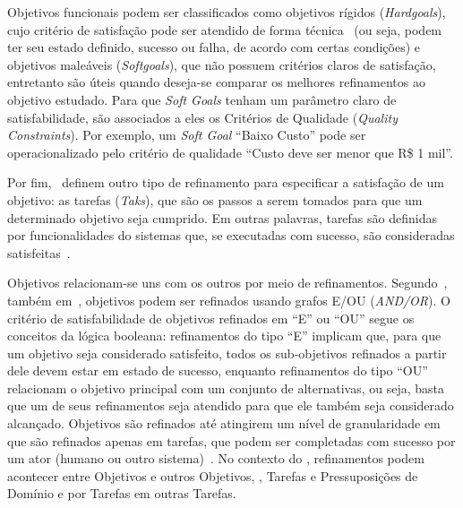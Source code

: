 Objetivos funcionais podem ser classificados como objetivos rígidos (\textit{Hardgoals}), cujo critério de satisfação pode ser atendido de forma técnica~\cite{dardenne1993goal} (ou seja, podem ter seu estado definido, sucesso ou falha, de acordo com certas condições) e objetivos maleáveis (\textit{Softgoals}), que não possuem critérios claros de satisfação, entretanto são úteis quando deseja-se comparar os melhores refinamentos ao objetivo estudado. Para que \textit{Soft Goals} tenham um parâmetro claro de satisfabilidade, são associados a eles os Critérios de Qualidade (\textit{Quality Constraints}). Por exemplo, um \textit{Soft Goal} ``Baixo Custo'' pode ser operacionalizado pelo critério de qualidade ``Custo deve ser menor que R\$ 1 mil''.

Por fim,~ definem outro tipo de refinamento para especificar a satisfação de um objetivo: as tarefas (\textit{Taks}), que são os passos a serem tomados para que um determinado objetivo seja cumprido. Em outras palavras, tarefas são definidas por funcionalidades do sistemas que, se executadas com sucesso, são consideradas satisfeitas~\cite{souza2012requirement}.

Objetivos relacionam-se uns com os outros por meio de refinamentos. Segundo~, também em~\cite{dardenne1993goal}, objetivos podem ser refinados usando grafos E/OU (\textit{AND/OR}). O critério de satisfabilidade de objetivos refinados em ``E'' ou ``OU'' segue os conceitos da lógica booleana: refinamentos do tipo ``E'' implicam que, para que um objetivo seja considerado satisfeito, todos os sub-objetivos refinados a partir dele devem estar em estado de sucesso, enquanto refinamentos do tipo ``OU'' relacionam o objetivo principal com um conjunto de alternativas, ou seja, basta que um de seus refinamentos seja atendido para que ele também seja considerado alcançado. Objetivos são refinados até atingirem um nível de granularidade em que são refinados apenas em tarefas, que podem ser completadas com sucesso por um ator (humano ou outro sistema)~\cite{souza2013awareness}. No contexto do \zanshin, refinamentos podem acontecer entre Objetivos e outros Objetivos, \sofgoals, Tarefas e Pressuposições de Domínio e por Tarefas em outras Tarefas.

